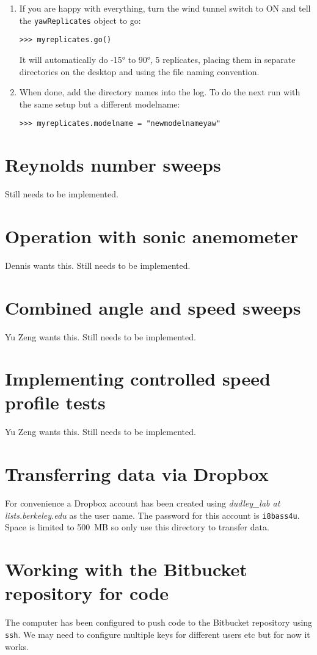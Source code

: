 \documentclass{article}
\begin{document}
\begin{enumerate}
\item{If you are happy with everything, turn the wind tunnel switch to ON and tell the {\tt yawReplicates} object to go:
\begin{verbatim}
>>> myreplicates.go()
\end{verbatim}
It will automatically do \ang{-15} to \ang{90}, 5 replicates, placing them in separate directories on the desktop and using the file naming convention.}

\item{When done, add the directory names into the log. To do the next run with the same setup but a different modelname:
\begin{verbatim}
>>> myreplicates.modelname = "newmodelnameyaw"
\end{verbatim}
}

\end{enumerate}

\section{Reynolds number sweeps}
Still needs to be implemented.

\section{Operation with sonic anemometer}
Dennis wants this.  Still needs to be implemented.

\section{Combined angle and speed sweeps}
Yu Zeng wants this. Still needs to be implemented. 

\section{Implementing controlled speed profile tests}
Yu Zeng wants this.  Still needs to be implemented.

\section{Transferring data via Dropbox}
For convenience a Dropbox account has been created using \emph{dudley\_lab at lists.berkeley.edu} as the user name.  The password for this account is \texttt{i8bass4u}.   Space is limited to \SI{500}{MB} so only use this directory to transfer data.  

\section{Working with the Bitbucket repository for code}
The computer has been configured to push code to the Bitbucket repository using \texttt{ssh}.  We may need to configure multiple keys for different users etc but for now it works. 
\end{document}

